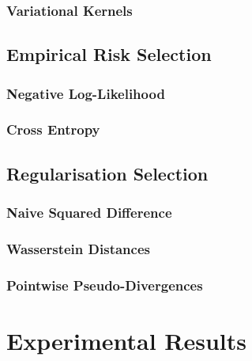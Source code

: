 \documentclass{article}
\numberwithin{equation}{section}
\begin{document}
\subsubsection{Variational Kernels}
\subsection{Empirical Risk Selection}
\subsubsection{Negative Log-Likelihood}
\subsubsection{Cross Entropy}
\subsection{Regularisation Selection}
\subsubsection{Naive Squared Difference}
\subsubsection{Wasserstein Distances}
\subsubsection{Pointwise Pseudo-Divergences}

\newpage
\section{Experimental Results}
\end{document}
